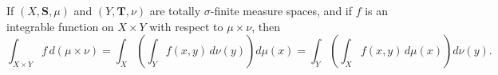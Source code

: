 If $(X, \mathbf{S}, \mu)$ and $(Y, \mathbf{T}, \nu)$ are totally $\sigma$-finite measure spaces, and if $f$ is an integrable function on $X \times Y$ with respect to $\mu \times \nu$, then
$$\int_{X \times Y} f \,d(\mu \times \nu) = \int_X \left( \int_Y f(x,y) \,d\nu(y) \right) d\mu(x) = \int_Y \left( \int_X f(x,y) \,d\mu(x) \right) d\nu(y).$$
